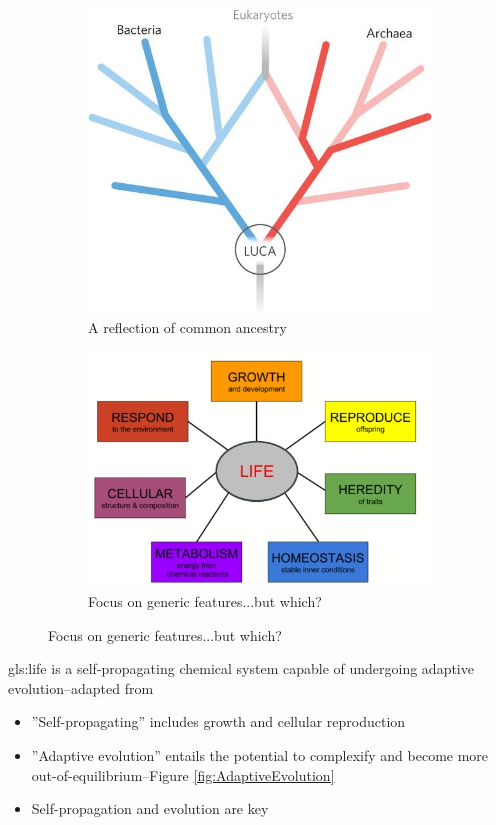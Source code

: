 \documentclass[]{article}
\begin{document}
\begin{figure}[H]
	\begin{subfigure}[b]{0.45\textwidth}
		\centering
		\caption{A reflection of common ancestry}\label{fig:LUCA_common} 
		\includegraphics[width=\textwidth]{LUCA_common}
	\end{subfigure}
	\begin{subfigure}[b]{0.45\textwidth}
		\centering
		\caption{Focus on generic features...but which?}\label{fig:lawki-focus} 
		\includegraphics[width=\textwidth]{lawki-focus}
	\end{subfigure}
\end{figure}

\gls{gls:life} is a self-propagating chemical system capable of undergoing adaptive evolution--adapted from \cite{deamer1994origins}
\begin{itemize}
	\item ''Self-propagating'' includes growth and cellular reproduction 
	\item ''Adaptive evolution'' entails the potential to complexify and become more out-of-equilibrium--Figure \ref{fig:AdaptiveEvolution}
	\item Self-propagation and evolution are key
\end{itemize}
\end{document}

